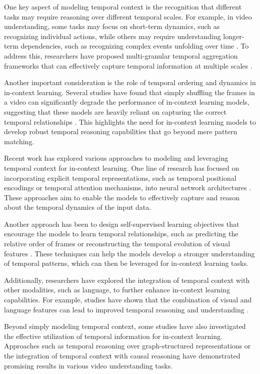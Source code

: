 \documentclass[11pt]{article}
\begin{document}
One key aspect of modeling temporal context is the recognition that different tasks may require reasoning over different temporal scales. For example, in video understanding, some tasks may focus on short-term dynamics, such as recognizing individual actions, while others may require understanding longer-term dependencies, such as recognizing complex events unfolding over time \cite{ref151,ref151}. To address this, researchers have proposed multi-granular temporal aggregation frameworks that can effectively capture temporal information at multiple scales \cite{ref152}.

Another important consideration is the role of temporal ordering and dynamics in in-context learning. Several studies have found that simply shuffling the frames in a video can significantly degrade the performance of in-context learning models, suggesting that these models are heavily reliant on capturing the correct temporal relationships \cite{ref153,ref154}. This highlights the need for in-context learning models to develop robust temporal reasoning capabilities that go beyond mere pattern matching.

Recent work has explored various approaches to modeling and leveraging temporal context for in-context learning. One line of research has focused on incorporating explicit temporal representations, such as temporal positional encodings or temporal attention mechanisms, into neural network architectures \cite{ref155,ref156}. These approaches aim to enable the models to effectively capture and reason about the temporal dynamics of the input data.

Another approach has been to design self-supervised learning objectives that encourage the models to learn temporal relationships, such as predicting the relative order of frames or reconstructing the temporal evolution of visual features \cite{ref157,ref158}. These techniques can help the models develop a stronger understanding of temporal patterns, which can then be leveraged for in-context learning tasks.

Additionally, researchers have explored the integration of temporal context with other modalities, such as language, to further enhance in-context learning capabilities. For example, studies have shown that the combination of visual and language features can lead to improved temporal reasoning and understanding \cite{ref159,ref160}.

Beyond simply modeling temporal context, some studies have also investigated the effective utilization of temporal information for in-context learning. Approaches such as temporal reasoning over graph-structured representations \cite{ref161,ref162} or the integration of temporal context with causal reasoning \cite{ref163} have demonstrated promising results in various video understanding tasks.
\end{document}
